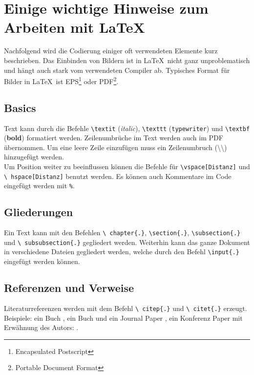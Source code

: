 \chapter{Einige wichtige Hinweise zum Arbeiten mit \LaTeX\ }
\label{sec:latexumg}

Nachfolgend wird die Codierung einiger oft verwendeten Elemente
kurz beschrieben. Das Einbinden von Bildern ist in \LaTeX\ nicht
ganz unproblematisch und hängt auch stark vom verwendeten Compiler
ab. Typisches Format für Bilder in \LaTeX\ ist
EPS\footnote{Encapsulated Postscript} oder 
PDF\footnote{Portable Document Format}.

\section{Basics}
\label{sec:basics}
Text kann durch die Befehle \texttt{\textbackslash textit} 
(\textit{italic}), \texttt{\textbackslash texttt}  (\texttt{typewriter}) 
und \texttt{\textbackslash textbf} (\textbf{bold}) formatiert werden. 
Zeilenumbrüche im Text werden auch im PDF übernommen. Um eine leere Zeile 
einzufügen muss ein Zeilenumbruch (\textbackslash \textbackslash) 
hinzugefügt werden.\\

Um Position weiter zu beeinflussen können die Befehle für 
\texttt{\textbackslash vspace[Distanz]} und \texttt{\textbackslash 
hspace[Distanz]} benutzt werden.
Es können auch Kommentare im Code eingefügt werden mit \texttt{\%}.

\section{Gliederungen}
\label{sec:gliederung}

Ein Text kann mit den Befehlen \texttt{\textbackslash
chapter\{.\}}, \texttt{\textbackslash section\{.\}},
\texttt{\textbackslash subsection\{.\}} und \texttt{\textbackslash
subsubsection\{.\}} gegliedert werden. Weiterhin kann das ganze Dokument 
in verschiedene Dateien gegliedert werden, welche durch den Befehl 
\texttt{\textbackslash input\{.\}} eingefügt werden können.


\section{Referenzen und Verweise}
\label{sec:refverw}

Literaturreferenzen werden mit dem Befehl \texttt{\textbackslash
citep\{.\}} und \texttt{\textbackslash
citet\{.\}} erzeugt. Beispiele: ein Buch 
\citep{Raibert1986LeggedRobotsThatBalance}, ein Buch und ein Journal 
Paper \citep{Raibert1986LeggedRobotsThatBalance,Vukobratovic2004ZeroMomentPoint}, 
ein Konferenz Paper mit Erwähnung des Autors: \citet{Pratt1995SEA}.

